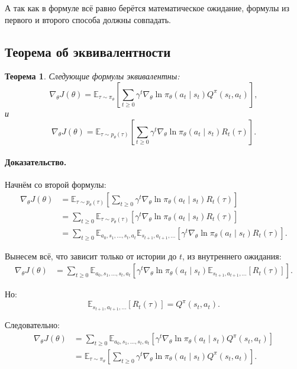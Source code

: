 \documentclass[12pt,a4paper]{article}
\newtheorem{theorem}{Теорема}
\begin{document}
А так как в формуле всё равно берётся математическое ожидание, формулы из первого и второго способа должны совпадать.

\subsection{Теорема об эквивалентности}

\begin{theorem}
Следующие формулы эквивалентны:
\[
\nabla_\theta J(\theta)
=
\mathbb E_{\tau\sim\pi_\theta}
\left[
\sum_{t\ge 0}
\gamma^t
\nabla_\theta
\ln \pi_\theta(a_t\mid s_t)
Q^\pi(s_t,a_t)
\right],
\]
и
\[
\nabla_\theta J(\theta)
=
\mathbb E_{\tau\sim p_\theta(\tau)}
\left[
\sum_{t\ge 0}
\gamma^t
\nabla_\theta
\ln \pi_\theta(a_t\mid s_t)
R_t(\tau)
\right].
\]
\end{theorem}

\paragraph{Доказательство.}

Начнём со второй формулы:
\[
\begin{aligned}
\nabla_\theta J(\theta)
&=
\mathbb E_{\tau\sim p_\theta(\tau)}
\left[
\sum_{t\ge 0}
\gamma^t
\nabla_\theta
\ln \pi_\theta(a_t\mid s_t)
R_t(\tau)
\right]
\\
&=
\sum_{t\ge 0}
\mathbb E_{\tau\sim p_\theta(\tau)}
\left[
\gamma^t
\nabla_\theta
\ln \pi_\theta(a_t\mid s_t)
R_t(\tau)
\right]
\\
&=
\sum_{t\ge 0}
\mathbb E_{a_0,s_1,\ldots,s_t,a_t}
\mathbb E_{s_{t+1},a_{t+1},\ldots}
\left[
\gamma^t
\nabla_\theta
\ln \pi_\theta(a_t\mid s_t)
R_t(\tau)
\right].
\end{aligned}
\]

Вынесем всё, что зависит только от истории до $t$, из внутреннего ожидания:
\[
\begin{aligned}
\nabla_\theta J(\theta)
&=
\sum_{t\ge 0}
\mathbb E_{a_0,s_1,\ldots,s_t,a_t}
\left[
\gamma^t
\nabla_\theta
\ln \pi_\theta(a_t\mid s_t)
\mathbb E_{s_{t+1},a_{t+1},\ldots}
\left[
R_t(\tau)
\right]
\right].
\end{aligned}
\]

Но:
\[
\mathbb E_{s_{t+1},a_{t+1},\ldots}
\left[
R_t(\tau)
\right]
=
Q^\pi(s_t,a_t).
\]

Следовательно:
\[
\begin{aligned}
\nabla_\theta J(\theta)
&=
\sum_{t\ge 0}
\mathbb E_{a_0,s_1,\ldots,s_t,a_t}
\left[
\gamma^t
\nabla_\theta
\ln \pi_\theta(a_t\mid s_t)
Q^\pi(s_t,a_t)
\right]
\\
&=
\mathbb E_{\tau\sim\pi_\theta}
\left[
\sum_{t\ge 0}
\gamma^t
\nabla_\theta
\ln \pi_\theta(a_t\mid s_t)
Q^\pi(s_t,a_t)
\right].
\end{aligned}
\]
\end{document}
